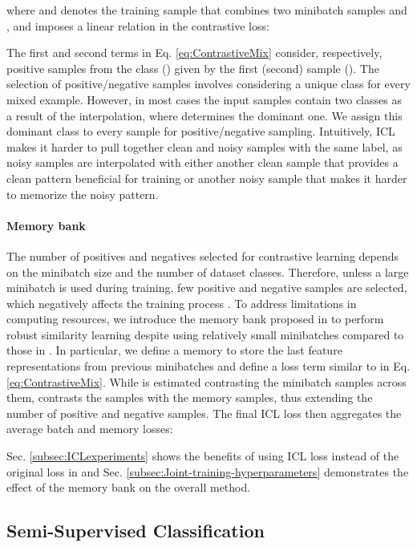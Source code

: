 \documentclass[final]{cvpr}
\begin{document}
where  and  denotes the training sample that combines two minibatch samples  and , and imposes a linear relation in the contrastive loss:  

The first and second terms in Eq. \ref{eq:ContrastiveMix} consider, respectively, positive samples from the class  () given by the first (second) sample  (). The selection of positive/negative samples involves considering a unique class for every mixed example. However, in most cases the input samples contain two classes as a result of the interpolation, where  determines the dominant one. We assign this dominant class to every sample for positive/negative sampling. Intuitively, ICL makes it harder to pull together clean and noisy samples with the same label, as noisy samples are interpolated with either another clean sample that provides a
clean pattern beneficial for training or another noisy sample that makes it harder to memorize the noisy pattern. 

\paragraph{Memory bank}

The number of positives and negatives selected for contrastive learning depends on the minibatch size and the number of dataset classes. Therefore, unless a large minibatch is used during training, few positive and negative samples are selected, which negatively affects the training process \cite{2020_arXiv_SupContLearn}. To address limitations in computing resources, we introduce the memory bank proposed in \cite{2020_CVPR_XBM} to perform robust similarity learning despite using relatively small minibatches compared to those in \cite{2020_arXiv_SupContLearn}. In particular, we define a memory to store the last  feature representations from previous minibatches and define a loss term  similar to  in Eq. \ref{eq:ContrastiveMix}. While  is estimated contrasting the  minibatch samples across them,  contrasts the  samples with the  memory samples, thus extending the number of positive and negative samples. The final ICL loss then aggregates the average batch and memory losses:

Sec. \ref{subsec:ICLexperiments} shows the benefits of using ICL loss instead of the original loss in \cite{2020_arXiv_SupContLearn} and Sec. \ref{subsec:Joint-training-hyperparameters} demonstrates the effect of the memory bank on the overall method.

\subsection{Semi-Supervised Classification\label{subsec:Semi-Supervised-Classification}}
\end{document}
